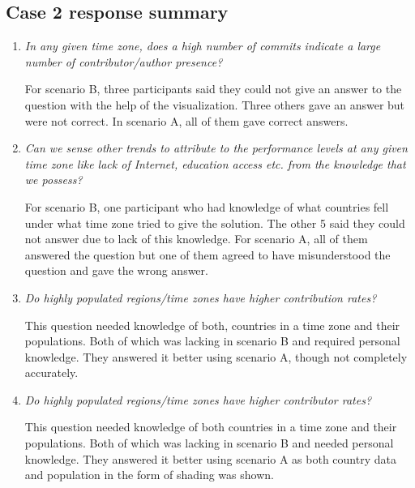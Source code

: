 \documentclass[double,12pt]{beavtex}
\begin{document}
\subsection{Case 2 response summary}

\begin{enumerate}
\item {\em In any given time zone, does a high number of commits indicate a large number of contributor/author presence?}


For scenario B, three participants said they could not give an answer to the question with the help of the visualization. Three others gave an answer but were not correct. In scenario A, all of them gave correct answers.


\item {\em Can we sense other trends to attribute to the performance levels at any given time zone like lack of Internet, education access etc. from the knowledge that we possess?}


For scenario B, one participant who had knowledge of what countries fell under what time zone tried to give the solution. The other 5 said they could not answer due to lack of this knowledge. For scenario A, all of them answered the question but one of them agreed to have misunderstood the question and gave the wrong answer.


\item{\em Do highly populated regions/time zones have higher contribution rates?}


This question needed knowledge of both, countries in a time zone and their populations. Both of which was lacking in scenario B and required personal knowledge. They answered it better using scenario A, though not completely accurately.

\item {\em Do highly populated regions/time zones have higher contributor rates?}


This question needed knowledge of both countries in a time zone and their populations. Both of which was lacking in scenario B and needed personal knowledge. They answered it better using scenario A as both country data and population in the form of shading was shown.


\end{enumerate}
\end{document}
